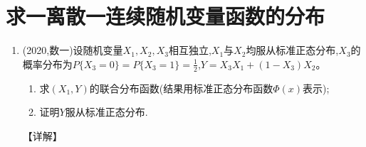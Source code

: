 \documentclass[12pt, a4paper, oneside, UTF8]{ctexbook}
\begin{document}
\section{求一离散一连续随机变量函数的分布}

\begin{enumerate}[label=\arabic*.,start=14]
    \item  (2020,数一)设随机变量$X_1,X_2,X_3$相互独立,$X_1$与$X_2$均服从标准正态分布,$X_3$的概率分布为$P\{X_3=0\}=P\{X_3=1\}=\frac{1}{2}$,$Y=X_3X_1+(1-X_3)X_2$。
    \begin{enumerate}
        \item 求$(X_1,Y)$的联合分布函数(结果用标准正态分布函数$\Phi(x)$表示);
        \item 证明$Y$服从标准正态分布.
    \end{enumerate}
    
    \begin{solution}
    【详解】
    \end{solution}
\end{enumerate}

\ifx\allfiles\undefined
\end{document}
